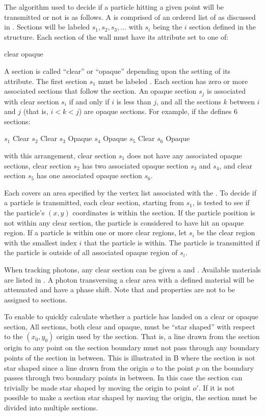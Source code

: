 The algorithm used to decide if a particle hitting a given point will be transmitted or not is as
follows.  A  is comprised of an ordered list of  as discussed in
.  Sections will be labeled $s_1, s_2, s_3, \ldots$ with $s_i$ being the $i$\Th
section defined in the  structure. Each section of the wall must have its 
attribute set to one of:
\begin{example}
  clear
  opaque
\end{example}
A section is called ``clear'' or ``opaque'' depending upon the setting of its  attribute.
The first section $s_1$ must be labeled . Each  section has zero or more
associated  sections that follow the  section. An opaque section $s_j$ is
associated with clear section $s_i$ if and only if $i$ is less than $j$, and all the sections $k$
between $i$ and $j$ (that is, $i < k < j$) are opaque sections. For example, if the 
defines 6 sections:
\begin{example}
  \(s_1\)   Clear
  \(s_2\)   Clear
  \(s_3\)   Opaque
  \(s_4\)   Opaque
  \(s_5\)   Clear
  \(s_6\)   Opaque
\end{example}
with this arrangement, clear section $s_1$ does not have any associated opaque sections, clear section
$s_2$ has two associated opaque section $s_3$ and $s_4$, and clear section $s_5$ has one associated
opaque section $s_6$.

Each  covers an area specified by the vertex list associated with the . To
decide if a particle is transmitted, each clear section, starting from $s_1$, is tested to see if
the particle's $(x,y)$ coordinates is within the section. If the particle position is not within any
clear section, the particle is considered to have hit an opaque region. If a particle is within one
or more clear regions, let $s_i$ be the clear region with the smallest index $i$ that the particle
is within. The particle is transmitted if the particle is outside of all associated opaque region of
$s_i$.

When tracking photons, any clear section can be given a  and . Available
materials are listed in . A photon transversing a clear area with a defined
material will be attenuated and have a phase shift. Note that  and 
properties are not to be assigned to  sections.

To enable \bmad to quickly calculate whether a particle has landed on a clear or opaque section, All
sections, both clear and opaque, must be ``star shaped'' with respect to the $(x_0, y_0)$ origin
used by the section. That is, a line drawn from the section origin to any point on the section
boundary must not pass through any boundary points of the section in between. This is illustrated in
B where the section is not star shaped since a line drawn from the origin $o$ to
the point $p$ on the boundary passes through two boundary points in between. In this case the
section can trivially be made star shaped by moving the origin to point $o'$. If it is not possible
to make a section star shaped by moving the origin, the section must be divided into multiple
sections.

